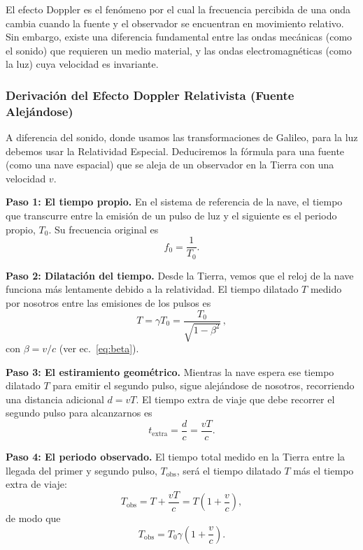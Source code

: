 \documentclass[11pt,a4paper]{book}
\begin{document}
El efecto Doppler es el fenómeno por el cual la frecuencia percibida de una onda cambia cuando la fuente y el observador se encuentran en movimiento relativo. Sin embargo, existe una diferencia fundamental entre las ondas mecánicas (como el sonido) que requieren un medio material, y las ondas electromagnéticas (como la luz) cuya velocidad es invariante.

\subsubsection*{Derivación del Efecto Doppler Relativista (Fuente Alejándose)}

A diferencia del sonido, donde usamos las transformaciones de Galileo, para la luz debemos usar la Relatividad Especial. Deduciremos la fórmula para una fuente (como una nave espacial) que se aleja de un observador en la Tierra con una velocidad $v$.

\textbf{Paso 1: El tiempo propio.} En el sistema de referencia de la nave, el tiempo que transcurre entre la emisión de un pulso de luz y el siguiente es el periodo propio, $T_0$. Su frecuencia original es
\begin{equation}
    f_0 = \frac{1}{T_0}.
\end{equation}

\textbf{Paso 2: Dilatación del tiempo.} Desde la Tierra, vemos que el reloj de la nave funciona más lentamente debido a la relatividad. El tiempo dilatado $T$ medido por nosotros entre las emisiones de los pulsos es
\begin{equation}
    T = \gamma T_0 = \frac{T_0}{\sqrt{1 - \beta^2}}\,,
\end{equation}
con $\beta=v/c$ (ver ec.~\ref{eq:beta}).

\textbf{Paso 3: El estiramiento geométrico.} Mientras la nave espera ese tiempo dilatado $T$ para emitir el segundo pulso, sigue alejándose de nosotros, recorriendo una distancia adicional $d = v T$. El tiempo extra de viaje que debe recorrer el segundo pulso para alcanzarnos es
\begin{equation}
    t_{\text{extra}} = \frac{d}{c} = \frac{v T}{c}.
\end{equation}

\textbf{Paso 4: El periodo observado.} El tiempo total medido en la Tierra entre la llegada del primer y segundo pulso, $T_{\text{obs}}$, será el tiempo dilatado $T$ más el tiempo extra de viaje:
\begin{equation}
    T_{\text{obs}} = T + \frac{v T}{c} = T \left(1 + \frac{v}{c}\right),
\end{equation}
de modo que
\begin{equation}
\label{eq:tobs0}
    T_{\text{obs}} =  T_0\gamma \left(1 + \frac{v}{c}\right).
\end{equation}
\end{document}
